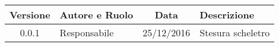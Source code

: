 
\begin{center}
	\begin{tabular}{cp{3cm}cp{3cm}}
	\textbf{Versione} & \textbf{Autore e Ruolo} & \textbf{Data} & \textbf{Descrizione} \\ \hline
	0.0.1 & {\LB} Responsabile & 25/12/2016 & Stesura scheletro \\ \hline
	\end{tabular}
\end{center}
